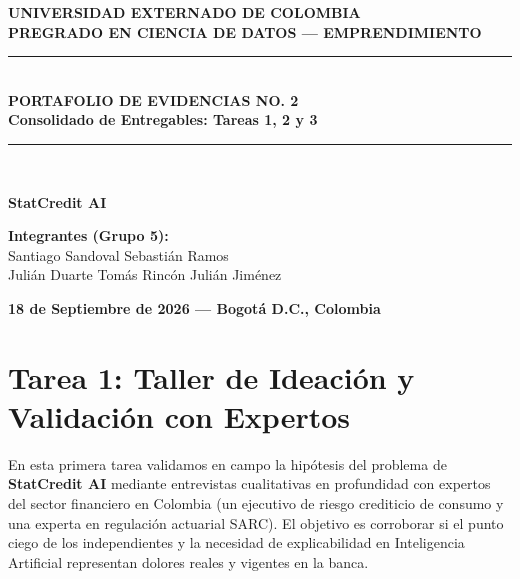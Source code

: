\documentclass[11pt,a4paper]{article}
\begin{document}
\begin{titlepage}
    \centering
    \vspace*{1cm}
    {\Huge \textbf{UNIVERSIDAD EXTERNADO DE COLOMBIA}}\\[0.4cm]
    {\Large \textbf{PREGRADO EN CIENCIA DE DATOS --- EMPRENDIMIENTO}}\\[1.8cm]
    
    \rule{\linewidth}{0.8mm}\\[0.4cm]
    {\Huge \textbf{PORTAFOLIO DE EVIDENCIAS NO. 2}}\\[0.3cm]
    {\Large \textbf{Consolidado de Entregables: Tareas 1, 2 y 3}}\\[0.4cm]
    \rule{\linewidth}{0.8mm}\\[1.8cm]
    
    \begin{tcolorbox}[colback=primary!5,colframe=primary]
        \centering \Huge
        \textbf{StatCredit AI}
    \end{tcolorbox}
    
    \vfill
    
    \begin{minipage}{0.8\textwidth}
        \centering
        \textbf{\large Integrantes (Grupo 5):}\\[0.3cm]
        Santiago Sandoval \quad\vert\quad Sebastián Ramos\\[0.15cm]
        Julián Duarte \quad\vert\quad Tomás Rincón \quad\vert\quad Julián Jiménez
    \end{minipage}
    
    \vfill
    {\large \textbf{18 de Septiembre de 2026 --- Bogotá D.C., Colombia}}
\end{titlepage}

\newpage
\tableofcontents
\newpage

\section{Tarea 1: Taller de Ideación y Validación con Expertos}

\begin{tcolorbox}[colback=primary!5,colframe=primary,title=\textbf{¿De qué trata este entregable?}]
En esta primera tarea validamos en campo la hipótesis del problema de \textbf{StatCredit AI} mediante entrevistas cualitativas en profundidad con expertos del sector financiero en Colombia (un ejecutivo de riesgo crediticio de consumo y una experta en regulación actuarial SARC). El objetivo es corroborar si el punto ciego de los independientes y la necesidad de explicabilidad en Inteligencia Artificial representan dolores reales y vigentes en la banca.
\end{tcolorbox}
\end{document}

